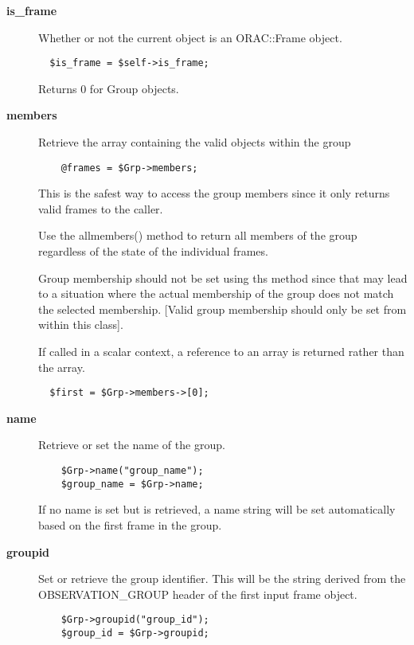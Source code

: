 \begin{description}
\item[{\textbf{is\_frame}}] \mbox{}

Whether or not the current object is an ORAC::Frame object.

\begin{verbatim}
  $is_frame = $self->is_frame;
\end{verbatim}


Returns 0 for Group objects.


\item[{\textbf{members}}] \mbox{}

Retrieve the array containing the valid objects within the group

\begin{verbatim}
    @frames = $Grp->members;
\end{verbatim}


This is the safest way to access the group members
since it only returns valid frames to the caller.



Use the allmembers() method to return all members of the group
regardless of the state of the individual frames.



Group membership should not be set using ths method since that may lead
to a situation where the actual membership of the group does not match the
selected membership. [Valid group membership should only be set from
within this class].



If called in a scalar context, a reference to an array is returned
rather than the array.

\begin{verbatim}
  $first = $Grp->members->[0];
\end{verbatim}

\item[{\textbf{name}}] \mbox{}

Retrieve or set the name of the group.

\begin{verbatim}
    $Grp->name("group_name");
    $group_name = $Grp->name;
\end{verbatim}


If no name is set but is retrieved, a name string will be
set automatically based on the first frame in the group.


\item[{\textbf{groupid}}] \mbox{}

Set or retrieve the group identifier. This will
be the string derived from the OBSERVATION\_GROUP
header of the first input frame object.

\begin{verbatim}
    $Grp->groupid("group_id");
    $group_id = $Grp->groupid;
\end{verbatim}
\end{description}
